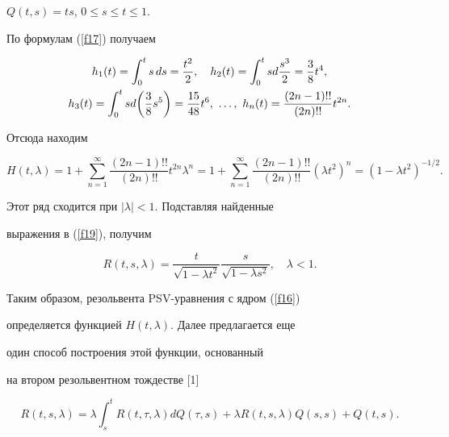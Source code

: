 \begin{exam} $Q(t,s)=ts$, $0\leq s\leq t\leq1.$


По формулам (\ref{f17}) получаем


\begin{gather*}


h_1(t)=\integral{0}{t}s\,ds=\frac{t^2}{2},\quad h_2(t)=\integral


{0}{t}sd\frac{s^3}{2}=\frac{3}{8}t^4,\\


%


h_3(t)=\integral{0}{t}sd\bigg(\frac{3}{8}s^5\bigg)=\frac{15}{48}


t^6,\ \dotsc,\ h_n(t)=\frac{(2n-1)!!}{(2n)!!}t^{2n}.


\end{gather*}


Отсюда находим


$$


H(t,\lambda)=1+\sum_{n=1}^\infty\frac{(2n-1)!!}{(2n)!!}t^{2n}


\lambda^n=1+\sum_{n=1}^\infty\frac{(2n-1)!!}{(2n)!!}(\lambda t^2)


^n=(1-\lambda t^2)^{-1/2}.


$$


Этот ряд сходится при $|\lambda|<1$. Подставляя найденные


выражения в (\ref{f19}), получим


$$


R(t,s,\lambda)=\frac{t}{\sqrt{1-\lambda t^2}}


\frac{s}{\sqrt{1-\lambda s^2}},\quad \lambda<1.


$$


\end{exam}





Таким образом, резольвента PSV-уравнения с ядром (\ref{f16})


определяется функцией $H(t,\lambda).$ Далее предлагается еще


один способ построения этой функции, основанный


на втором резольвентном тождестве [1]


$$


R(t,s,\lambda)=\lambda\int_s^t R(t,\tau,\lambda)dQ(\tau,s)+


\lambda R(t,s,\lambda)Q(s,s)+Q(t,s).


$$





